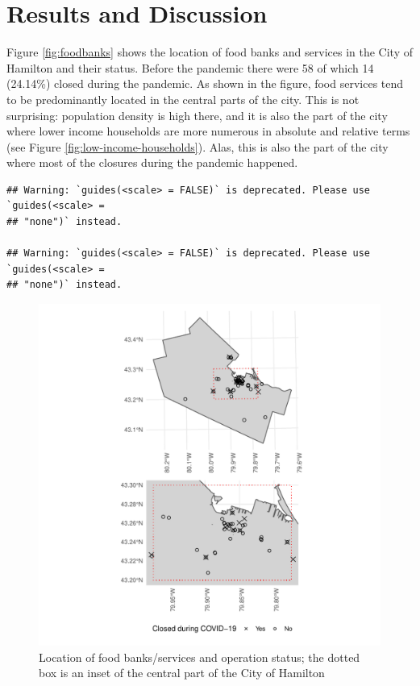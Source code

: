 \documentclass[]{elsarticle} %
\begin{document}
\hypertarget{results-and-discussion}{%
\section{Results and Discussion}\label{results-and-discussion}}

Figure \ref{fig:foodbanks} shows the location of food banks and services
in the City of Hamilton and their status. Before the pandemic there were
58 of which 14 (24.14\%) closed during the pandemic. As shown in the
figure, food services tend to be predominantly located in the central
parts of the city. This is not surprising: population density is high
there, and it is also the part of the city where lower income households
are more numerous in absolute and relative terms (see Figure
\ref{fig:low-income-households}). Alas, this is also the part of the
city where most of the closures during the pandemic happened.

\begin{verbatim}
## Warning: `guides(<scale> = FALSE)` is deprecated. Please use `guides(<scale> =
## "none")` instead.

## Warning: `guides(<scale> = FALSE)` is deprecated. Please use `guides(<scale> =
## "none")` instead.
\end{verbatim}

\begin{figure}
\includegraphics[width=1\linewidth]{Accessibility-Foodbanks-Hamilton-V0_files/figure-latex/plot-location-foodbanks-1} \caption{\label{fig:foodbanks}Location of food banks/services and operation status; the dotted box is an inset of the central part of the City of Hamilton}\label{fig:plot-location-foodbanks}
\end{figure}
\end{document}
